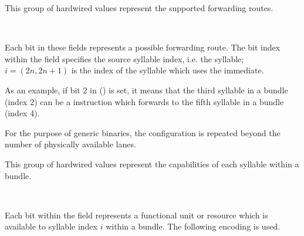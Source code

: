 This group of hardwired values represent the supported  forwarding
routes.

\reset{****************}
\  %
\reset{****************}

Each bit in these fields represents a possible  forwarding route. 
The bit index within the field specifies the source syllable index, i.e. the 
 syllable; $i = \left ( 2n, 2n+1 \right )$ is the index of the 
syllable which uses the immediate.

As an example, if bit 2 in  () is set, it means that 
the third syllable in a bundle (index 2) can be a  instruction which 
forwards to the fifth syllable in a bundle (index 4).

For the purpose of generic binaries, the configuration is repeated beyond the
number of physically available lanes.


This group of hardwired values represent the capabilities of each syllable
within a bundle.

\  %
\  %
\  %

Each bit within the field represents a functional unit or resource which is
available to syllable index $i$ within a bundle. The following encoding is used.

